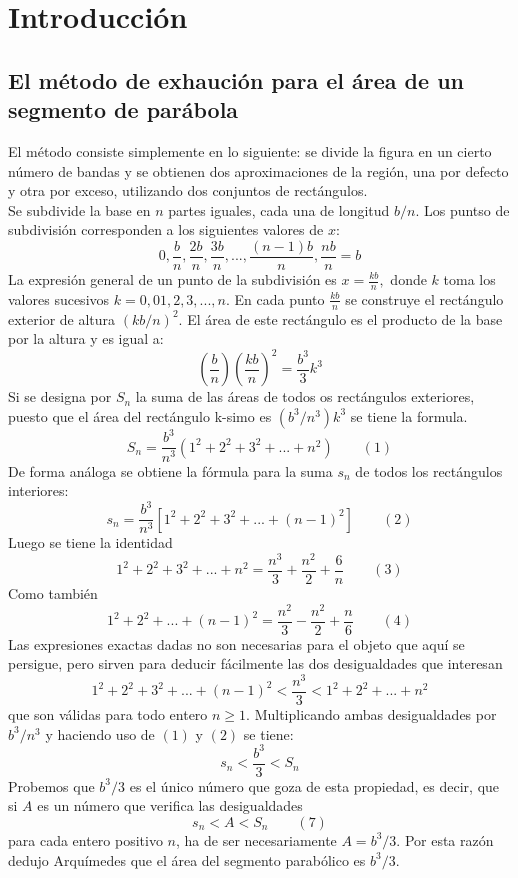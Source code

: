 \chapter*{Introducción}

\setcounter{chapter}{1}
\setcounter{section}{2}

\section{El método de exhaución para el área de un segmento de parábola}

El método consiste simplemente en lo siguiente: se divide la figura en un cierto número de bandas y se obtienen dos aproximaciones de la región, una por defecto y otra por exceso, utilizando dos conjuntos de rectángulos.\\
Se subdivide la base en $n$ partes iguales, cada una de longitud $b/n$. Los puntso de subdivisión corresponden a los siguientes valores de $x$: $$0,\dfrac{b}{n},\dfrac{2b}{n},\dfrac{3b}{n},...,\dfrac{(n-1)b}{n},\dfrac{nb}{n}=b$$
La expresión general de un punto de la subdivisión es $x=\frac{kb}{n},$ donde $k$ toma los valores sucesivos $k=0,01,2,3,...,n.$ En cada punto $\frac{kb}{n}$ se construye el rectángulo exterior de altura $(kb/n)^2$. El área de este rectángulo es el producto de la base por la altura y es igual a:
$$\left(\dfrac{b}{n}\right)\left(\dfrac{kb}{n}\right)^2=\dfrac{b^3}{3}k^3$$
Si se designa por $S_n$ la suma de las áreas de todos os rectángulos exteriores, puesto que el área del rectángulo k-simo es $(b^3/n^3)k^3$ se tiene la formula. $$S_n=\dfrac{b^3}{n^3}(1^2+2^2+3^2+...+n^2) \qquad (1)$$
De forma análoga se obtiene la fórmula para la suma $s_n$ de todos los rectángulos interiores:
$$s_n=\dfrac{b^3}{n^3}[1^2+2^2+3^2+...+(n-1)^2] \qquad (2)$$
Luego se tiene la identidad $$1^2+2^2+3^2+...+n^2=\dfrac{n^3}{3}+\dfrac{n^2}{2}+\dfrac{6}{n} \qquad (3)$$
Como también $$1^2+2^2+...+(n-1)^2=\dfrac{n^2}{3}-\dfrac{n^2}{2}+\dfrac{n}{6} \qquad (4)$$
Las expresiones exactas dadas no son necesarias para el objeto que aquí se persigue, pero sirven para deducir fácilmente las dos desigualdades que interesan $$1^2+2^2+3^2+...+(n-1)^2<\dfrac{n^3}{3}<1^2+2^2+...+n^2$$
que son válidas para todo entero $n\geq 1$. Multiplicando ambas desigualdades por $b^3/n^3$ y haciendo uso de $(1)$ y $(2)$ se tiene: $$s_n<\dfrac{b^3}{3}<S_n$$
Probemos que $b^3/3$ es el único número que goza de esta propiedad, es decir, que si $A$ es un número que verifica las desigualdades $$s_n<A<S_n \qquad (7)$$
para cada entero positivo $n$, ha de ser necesariamente $A=b^3/3$. Por esta razón dedujo Arquímedes que el área del segmento parabólico es $b^3/3$.\\
